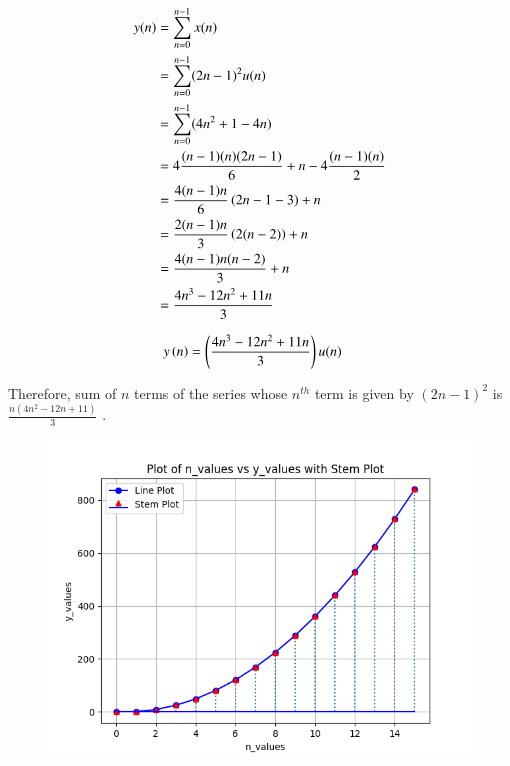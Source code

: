 \documentclass[journal,12pt,onecolumn]{IEEEtran}
\theoremstyle{remark}
\begin{document}
\begin{align}
y(n)&=\sum_{n=0}^{n-1} x(n) \\
&=\sum_{n=0}^{n-1} (2n-1)^2u(n) \\
&=\sum_{n=0}^{n-1} (4n^2+1-4n) \\
&=4\frac{(n-1)(n)(2n-1)}{6} + n -4\frac{(n-1)(n)}{2} \\
&=\frac{4(n-1)n}{6}\left(2n-1-3\right) + n \\
&=\frac{2(n-1)n}{3}\left(2(n-2)\right) + n \\
&=\frac{4(n-1)n(n-2)}{3} + n \\
&=\frac{4n^3 -12 n^2 +11n}{3}
\end{align}

\begin{align}
    y\left(n\right) &=\left(\frac{4n^{3}-12n^2+11n}{3}\right)u(n) 
\end{align}

Therefore, sum of $n$ terms of the series whose $n^{th}$ term is given by $(2n-1)^2$ is $\frac{n(4n^2-12n+11)}{3} $  .

\begin{figure}[h]
    \centering
    \includegraphics[scale=0.70]{./figs/fig2.png}
    \caption{ }
    \label{}
\end{figure}
\end{document}
